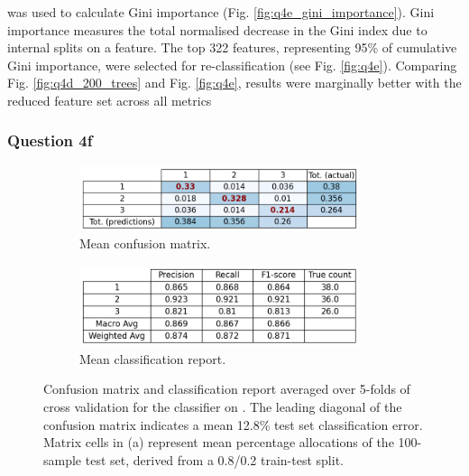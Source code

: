      was used to calculate Gini importance (Fig.
    \eqref{fig:q4e_gini_importance}).
    Gini importance measures the total normalised decrease in the Gini index due to internal splits on a feature.
    The top 322 features, representing 95\% of cumulative Gini importance, were selected for re-classification
    (see Fig. \eqref{fig:q4e}).
    Comparing Fig. \eqref{fig:q4d_200_trees} and Fig. \eqref{fig:q4e}, results were marginally better with the
    reduced feature set across all metrics

\subsubsection{Question 4f}\label{subsubsec:qf}
    \begin{figure}[htb]
    \centering
    \begin{subfigure}{0.5\textwidth}
        \centering
        \includegraphics[width=0.9\textwidth]{./figures/q4f_confusion_matrix_all_feats}
        \caption{Mean confusion matrix.}
        \label{fig:q4f_confusion_matrix_all_feats}
    \end{subfigure}%
    \begin{subfigure}{0.5\textwidth}
        \centering
        \includegraphics[width=0.9\textwidth]{./figures/q4f_classification_report_all_feats}
        \caption{Mean classification report.}
        \label{fig:q4f_classification_report_all_feats}
    \end{subfigure}
    \caption{Confusion matrix and classification report averaged over 5-folds of cross validation for the
         classifier on .
        The leading diagonal of the confusion matrix indicates a mean 12.8\% test set classification error.
        Matrix cells in (a) represent mean percentage allocations of the 100-sample test set, derived from a 0.8/0.2
        train-test split.}
    \label{fig:q4f_all_feats}
    \end{figure}

